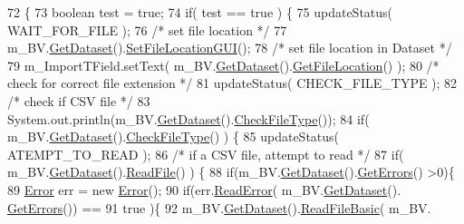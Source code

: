 \begin{DoxyCode}
72                                   \{
73         \textcolor{keywordtype}{boolean} test = \textcolor{keyword}{true};
74         \textcolor{keywordflow}{if}( test == \textcolor{keyword}{true} ) \{
75             updateStatus( WAIT\_FOR\_FILE );
76             \textcolor{comment}{/* set file location */}
77             m\_BV.\hyperlink{class_bob_viz_ab8866566b53e78c66e29a4d68406b860}{GetDataset}().\hyperlink{class_dataset_a26dd0cb28ef8622366d67e21c38b5b0d}{SetFileLocationGUI}();
78             \textcolor{comment}{/* set file location in Dataset */}
79             m\_ImportTField.setText( m\_BV.\hyperlink{class_bob_viz_ab8866566b53e78c66e29a4d68406b860}{GetDataset}().\hyperlink{class_dataset_a91fb1f2a983e9e5bef10864c0f4ec465}{GetFileLocation}() );
80             \textcolor{comment}{/* check for correct file extension */}
81             updateStatus( CHECK\_FILE\_TYPE );
82             \textcolor{comment}{/* check if CSV file */}
83             System.out.println(m\_BV.\hyperlink{class_bob_viz_ab8866566b53e78c66e29a4d68406b860}{GetDataset}().\hyperlink{class_dataset_a01147d9ebdff4ce95ed092143b4c5659}{CheckFileType}());
84             \textcolor{keywordflow}{if}( m\_BV.\hyperlink{class_bob_viz_ab8866566b53e78c66e29a4d68406b860}{GetDataset}().\hyperlink{class_dataset_a01147d9ebdff4ce95ed092143b4c5659}{CheckFileType}() ) \{
85                 updateStatus( ATEMPT\_TO\_READ );
86                 \textcolor{comment}{/* if a CSV file, attempt to read */}
87                 \textcolor{keywordflow}{if}( m\_BV.\hyperlink{class_bob_viz_ab8866566b53e78c66e29a4d68406b860}{GetDataset}().\hyperlink{class_dataset_a54d25635d79320caa77a9d6695e5cf3d}{ReadFile}() ) \{
88                     \textcolor{keywordflow}{if}(m\_BV.\hyperlink{class_bob_viz_ab8866566b53e78c66e29a4d68406b860}{GetDataset}().\hyperlink{class_dataset_a4a0a7e2a2a175ca3d0cebf9431b0e3f4}{GetErrors}() >0)\{
89                         \hyperlink{class_error}{Error} err = \textcolor{keyword}{new} \hyperlink{class_error}{Error}();
90                         \textcolor{keywordflow}{if}(err.\hyperlink{class_error_a56c2216c6ebe6f6b18625d901358ae77}{ReadError}( m\_BV.\hyperlink{class_bob_viz_ab8866566b53e78c66e29a4d68406b860}{GetDataset}().
      \hyperlink{class_dataset_a4a0a7e2a2a175ca3d0cebf9431b0e3f4}{GetErrors}()) == 
91                                 \textcolor{keyword}{true} )\{
92                             m\_BV.\hyperlink{class_bob_viz_ab8866566b53e78c66e29a4d68406b860}{GetDataset}().\hyperlink{class_dataset_abddca267426cbfcbc9a7d250ec53a5e5}{ReadFileBasic}( m\_BV.

\end{DoxyCode}
